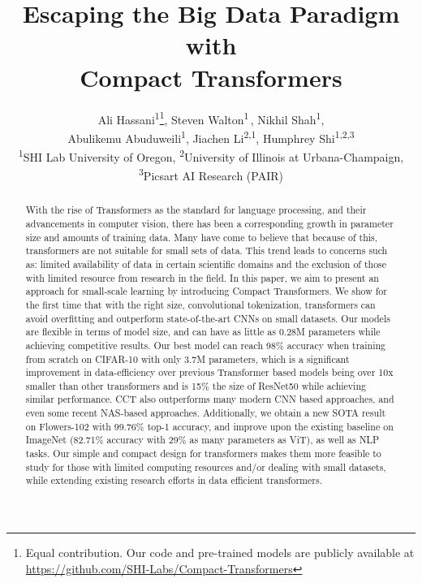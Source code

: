 \documentclass[10pt,twocolumn,letterpaper]{article}
\begin{document}
\title{Escaping the Big Data Paradigm with \\Compact Transformers}

\author{Ali Hassani\textsuperscript{1}\thanks{Equal contribution. Our code and pre-trained models are publicly available at \href{https://github.com/SHI-Labs/Compact-Transformers}{https://github.com/SHI-Labs/Compact-Transformers}}, Steven Walton\textsuperscript{1}\footnotemark[1] \,, Nikhil Shah\textsuperscript{1},\\Abulikemu Abuduweili\textsuperscript{1}, Jiachen Li\textsuperscript{2,1}, Humphrey Shi\textsuperscript{1,2,3} \\
{\small \textsuperscript{1}SHI Lab  University of Oregon, \textsuperscript{2}University of Illinois at Urbana-Champaign, \textsuperscript{3}Picsart AI Research (PAIR)}\\
}

\maketitle

\begin{abstract}
With the rise of Transformers as the standard for language processing, and their advancements in computer vision, there has been a corresponding growth in parameter size and amounts of training data. Many have come to believe that because of this, transformers are not suitable for small sets of data.
This trend leads to concerns such as: limited availability of data in certain scientific domains and the exclusion of those with limited resource from research in the field.
In this paper, we aim to present an approach for small-scale learning by introducing Compact Transformers.
We show for the first time that with the right size, convolutional tokenization, transformers can avoid overfitting and outperform state-of-the-art CNNs on small datasets.
Our models are flexible in terms of model size, and can have as little as 0.28M parameters while achieving competitive results.
Our best model can reach 98\% accuracy when training from scratch on CIFAR-10 with only 3.7M parameters, which is a significant improvement in data-efficiency over previous Transformer based models being over 10x smaller than other transformers and is 15\% the size of ResNet50 while achieving similar performance.
CCT also outperforms many modern CNN based approaches, and even some recent NAS-based approaches.
Additionally, we obtain a new SOTA result on Flowers-102 with 99.76\% top-1 accuracy, and improve upon the existing baseline on ImageNet (82.71\% accuracy with 29\% as many parameters as ViT), as well as NLP tasks.
Our simple and compact design for transformers makes them more feasible to study for those with limited computing resources and/or dealing with small datasets, while extending existing research efforts in data efficient transformers.
\end{abstract}
\end{document}
